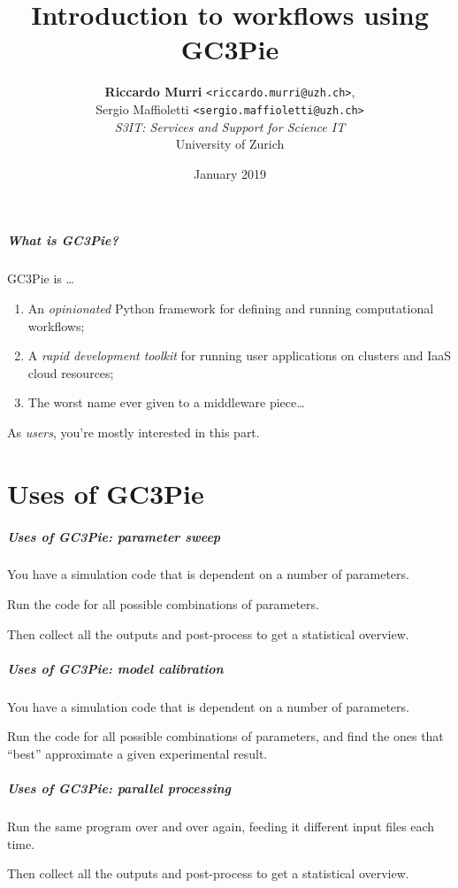 \documentclass[english,serif,mathserif,xcolor=pdftex,dvipsnames,table]{beamer}
\title[10. Workflows]{%
  Introduction to workflows
  using GC3Pie
}
\author[R.~Murri]{%
  \textbf{Riccardo Murri} \texttt{<riccardo.murri@uzh.ch>}, \\
  Sergio Maffioletti \texttt{<sergio.maffioletti@uzh.ch>}
  \\
  {\em S3IT: Services and Support for Science IT}
  \\
  University of Zurich
}
\date{January 2019}
\begin{document}
\maketitle

\begin{frame}
  \frametitle{What is GC3Pie?}
  GC3Pie is \ldots
  \begin{enumerate}
  \item An \emph{opinionated} Python framework for defining and running computational workflows;
  \item \alert<2>{A \emph{rapid development toolkit} for running user applications on clusters and IaaS cloud resources;}
  \item The worst name ever given to a middleware piece\ldots
  \end{enumerate}

  \+
  As \emph{users}, \alert<2>{you're mostly interested in this part.}
\end{frame}


\part{Uses of GC3Pie}

\begin{frame}[fragile]
  \frametitle{Uses of GC3Pie: parameter sweep}

  You have a simulation code that is dependent on a number of parameters.

  \+
  Run the code for all possible combinations of parameters.

  \+
  Then collect all the outputs and post-process to get a
  statistical overview.
\end{frame}


\begin{frame}[fragile]
  \frametitle{Uses of GC3Pie: model calibration}

  You have a simulation code that is dependent on a number of parameters.

  \+
  Run the code for all possible combinations of parameters, and
  find the ones that ``best'' approximate a given experimental result.
\end{frame}


\begin{frame}[fragile]
  \frametitle{Uses of GC3Pie: parallel processing}

  Run the same program over and over again,
  feeding it different input files each time.

  \+
  Then collect all the outputs and post-process to get a
  statistical overview.
\end{frame}
\end{document}
